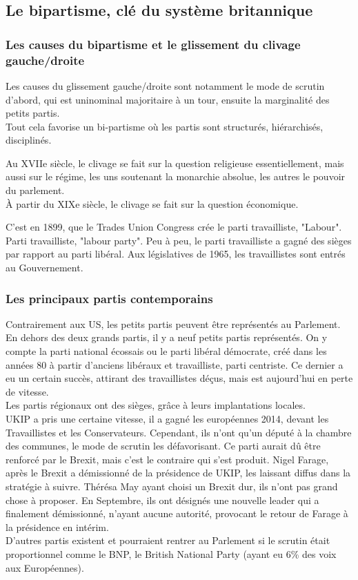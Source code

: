 \documentclass[10pt, a4paper, openany]{book}
\begin{document}
\subsection{Le bipartisme, clé du système britannique}

\subsubsection{Les causes du bipartisme et le glissement du clivage gauche/droite}

Les causes du glissement gauche/droite sont notamment le mode de scrutin d'abord, qui est uninominal majoritaire à un tour, ensuite la marginalité des petits partis. \\
Tout cela favorise un bi-partisme où les partis sont structurés, hiérarchisés, disciplinés. 


Au XVIIe siècle, le clivage se fait sur la question religieuse essentiellement, mais aussi sur le régime, les uns soutenant la monarchie absolue, les autres le pouvoir du parlement. \\
À partir du XIXe siècle, le clivage se fait sur la question économique. 


C'est en 1899, que le Trades Union Congress crée le parti travailliste, "Labour". \\
Parti travailliste, "labour party". Peu à peu, le parti travailliste a gagné des sièges par rapport au parti libéral. Aux législatives de 1965, les travaillistes sont entrés au Gouvernement. 

\subsubsection{Les principaux partis contemporains}

Contrairement aux US, les petits partis peuvent être représentés au Parlement. En dehors des deux grands partis, il y a neuf petits partis représentés. On y compte la parti national écossais ou le parti libéral démocrate, créé dans les années 80 à partir d'anciens libéraux et travailliste, parti centriste. Ce dernier a eu un certain succès, attirant des travaillistes déçus, mais est aujourd'hui en perte de vitesse. \\
Les partis régionaux ont des sièges, grâce à leurs implantations locales. \\
UKIP a pris une certaine vitesse, il a gagné les européennes 2014, devant les Travaillistes et les Conservateurs. Cependant, ils n'ont qu'un député à la chambre des communes, le mode de scrutin les défavorisant. Ce parti aurait dû être renforcé par le Brexit, mais c'est le contraire qui s'est produit. Nigel Farage, après le Brexit a démissionné de la présidence de UKIP, les laissant diffus dans la stratégie à suivre. Thérésa May ayant choisi un Brexit dur, ils n'ont pas grand chose à proposer. En Septembre, ils ont désignés une nouvelle leader qui a finalement démissionné, n'ayant aucune autorité, provocant le retour de Farage à la présidence en intérim. \\
D'autres partis existent et pourraient rentrer au Parlement si le scrutin était proportionnel comme le BNP, le British National Party (ayant eu 6\% des voix aux Européennes).
\end{document}
